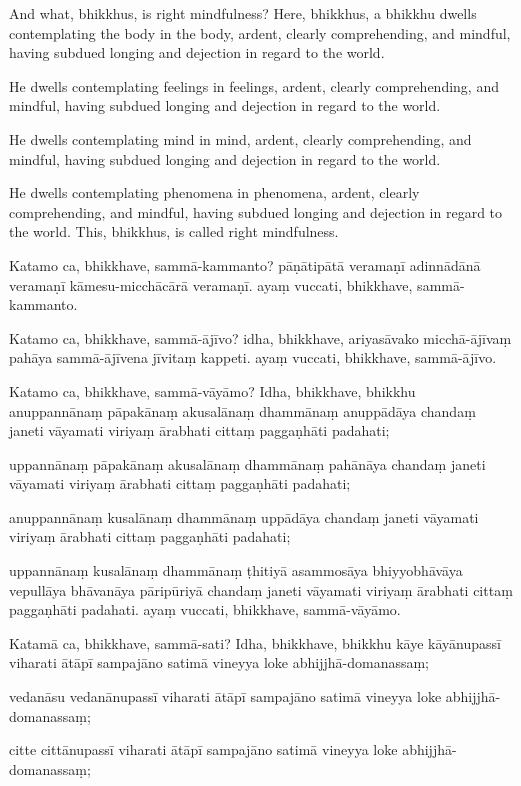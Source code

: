 And what, bhikkhus, is right mindfulness? Here, bhikkhus, a bhikkhu dwells
contemplating the body in the body, ardent, clearly comprehending, and mindful,
having subdued longing and dejection in regard to the world.

He dwells contemplating feelings in feelings, ardent, clearly comprehending, and
mindful, having subdued longing and dejection in regard to the world.

He dwells contemplating mind in mind, ardent, clearly comprehending, and
mindful, having subdued longing and dejection in regard to the world.

He dwells contemplating phenomena in phenomena, ardent, clearly comprehending,
and mindful, having subdued longing and dejection in regard to the world. This,
bhikkhus, is called right mindfulness.

\paliPage

Katamo ca, bhikkhave, sammā-kammanto? pāṇātipātā veramaṇī adinnādānā veramaṇī
kāmesu-micchācārā veramaṇī. ayaṃ vuccati, bhikkhave, sammā-kammanto.

Katamo ca, bhikkhave, sammā-ājīvo? idha, bhikkhave, ariyasāvako micchā-ājīvaṃ
pahāya sammā-ājīvena jīvitaṃ kappeti. ayaṃ vuccati, bhikkhave, sammā-ājīvo.

Katamo ca, bhikkhave, sammā-vāyāmo? Idha, bhikkhave, bhikkhu
anuppannānaṃ pāpakānaṃ akusalānaṃ dhammānaṃ
anuppādāya chandaṃ janeti vāyamati viriyaṃ ārabhati cittaṃ paggaṇhāti padahati;

uppannānaṃ pāpakānaṃ akusalānaṃ dhammānaṃ
pahānāya chandaṃ janeti vāyamati viriyaṃ ārabhati cittaṃ paggaṇhāti padahati;

anuppannānaṃ kusalānaṃ dhammānaṃ
uppādāya chandaṃ janeti vāyamati viriyaṃ ārabhati cittaṃ paggaṇhāti padahati;

uppannānaṃ kusalānaṃ dhammānaṃ
ṭhitiyā asammosāya bhiyyobhāvāya vepullāya
bhāvanāya pāripūriyā chandaṃ janeti vāyamati viriyaṃ ārabhati cittaṃ paggaṇhāti
padahati. ayaṃ vuccati, bhikkhave, sammā-vāyāmo.

Katamā ca, bhikkhave, sammā-sati? Idha, bhikkhave, bhikkhu kāye kāyānupassī
viharati ātāpī sampajāno satimā vineyya loke abhijjhā-domanassaṃ;

vedanāsu vedanānupassī viharati ātāpī sampajāno satimā vineyya loke
abhijjhā-domanassaṃ;

\enlargethispage{\baselineskip}

citte cittānupassī viharati ātāpī sampajāno satimā vineyya loke
abhijjhā-domanassaṃ;

